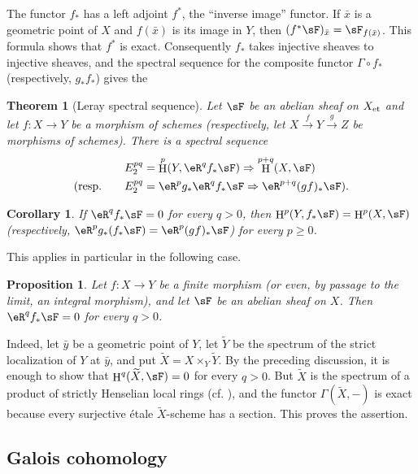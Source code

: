 \documentclass[12pt,oneside,english]{smfbook}
\DeclareMathOperator{\h}{H}
\newcommand{\et}[1]{{#1}_{\textnormal{et}}}
\newtheorem{proposition}[subsubsection]{Proposition}
\newtheorem{corollary}[subsubsection]{Corollary}
\newtheorem{theorem}[subsubsection]{Theorem}
\begin{document}
The functor $f_*$ has a left adjoint $f^*$, the ``inverse image'' functor. If $\bar x$ is a geometric point of $X$ and $f(\bar x)$ is its image in $Y$, then $(f^*\sF)_{\bar x}=\sF_{f(\bar x)}$. This formula shows that $f^*$ is exact. Consequently $f_*$ takes injective sheaves to injective sheaves, and the spectral sequence for the composite functor $\Gamma\circ f_*$ (respectively, $g_*f_*$) gives the

\begin{theorem}[Leray spectral sequence]\label{I:2-3-4}
Let $\sF$ be an abelian sheaf on $\et X$ and let $f:X\to Y$ be a morphism of schemes (respectively, let $X\xrightarrow fY\xrightarrow gZ$ be morphisms of schemes). There is a spectral sequence
\begin{align*}
  E_2^{pq} &= \h^p(Y,\eR^q f_* \sF) \Rightarrow \h^{p+q}(X,\sF) \\
  \text{(resp.}\qquad E_2^{pq} &= \eR^p g_* \eR^q f_* \sF \Rightarrow \eR^{p+q}(gf)_* \sF\text{).}
\end{align*}
\end{theorem}

\begin{corollary}\label{I:2-3-5}
If $\eR^qf_*\sF=0$ for every $q>0$, then $\h^p(Y,f_*\sF)=\h^p(X,\sF)$ (respectively, $\eR^pg_*(f_*\sF)=\eR^p(gf)_*\sF$) for every $p\geqslant0$.
\end{corollary}

This applies in particular in the following case.

\begin{proposition}\label{I:2-3-6}
Let $f:X\to Y$ be a finite morphism (or even, by passage to the limit, an integral morphism), and let $\sF$ be an abelian sheaf on $X$. Then $\eR^qf_*\sF=0$ for every $q>0$.
\end{proposition}

Indeed, let $\bar y$ be a geometric point of $Y$, let $\widetilde Y$ be the spectrum of the strict localization of $Y$ at $\bar y$, and put $\widetilde X=X\times_Y\widetilde Y$. By the preceding discussion, it is enough to show that $\h^q(\widetilde X,\sF)=0$ for every $q>0$. But $\widetilde X$ is the spectrum of a product of strictly Henselian local rings (cf. \cite[I]{ra70}), and the functor $\Gamma(\widetilde X,-)$ is exact because every surjective étale $\widetilde X$-scheme has a section. This proves the assertion.

\subsection{Galois cohomology}\label{I:2-4}
\end{document}
